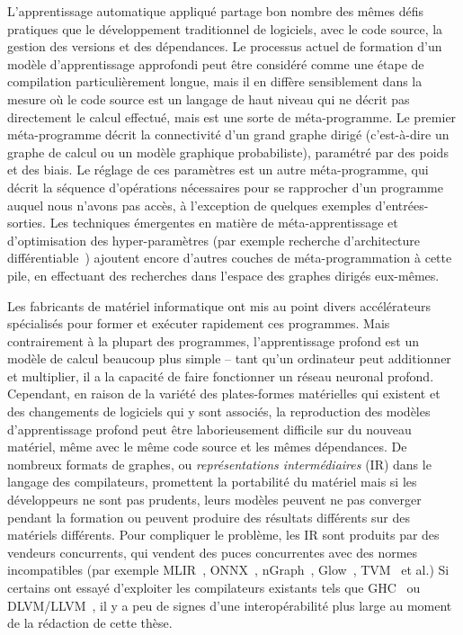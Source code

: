L'apprentissage automatique appliqué partage bon nombre des mêmes défis pratiques que le développement traditionnel de logiciels, avec le code source, la gestion des versions et des dépendances. Le processus actuel de formation d'un modèle d'apprentissage approfondi peut être considéré comme une étape de compilation particulièrement longue, mais il en diffère sensiblement dans la mesure où le code source est un langage de haut niveau qui ne décrit pas directement le calcul effectué, mais est une sorte de méta-programme. Le premier méta-programme décrit la connectivité d'un grand graphe dirigé (c'est-à-dire un graphe de calcul ou un modèle graphique probabiliste), paramétré par des poids et des biais. Le réglage de ces paramètres est un autre méta-programme, qui décrit la séquence d'opérations nécessaires pour se rapprocher d'un programme auquel nous n'avons pas accès, à l'exception de quelques exemples d'entrées-sorties. Les techniques émergentes en matière de méta-apprentissage et d'optimisation des hyper-paramètres (par exemple recherche d'architecture différentiable~\citep{liu2018darts}) ajoutent encore d'autres couches de méta-programmation à cette pile, en effectuant des recherches dans l'espace des graphes dirigés eux-mêmes.

Les fabricants de matériel informatique ont mis au point divers accélérateurs spécialisés pour former et exécuter rapidement ces programmes. Mais contrairement à la plupart des programmes, l'apprentissage profond est un modèle de calcul beaucoup plus simple -- tant qu'un ordinateur peut additionner et multiplier, il a la capacité de faire fonctionner un réseau neuronal profond. Cependant, en raison de la variété des plates-formes matérielles qui existent et des changements de logiciels qui y sont associés, la reproduction des modèles d'apprentissage profond peut être laborieusement difficile sur du nouveau matériel, même avec le même code source et les mêmes dépendances. De nombreux formats de graphes, ou \textit{représentations intermédiaires} (IR) dans le langage des compilateurs, promettent la portabilité du matériel mais si les développeurs ne sont pas prudents, leurs modèles peuvent ne pas converger pendant la formation ou peuvent produire des résultats différents sur des matériels différents. Pour compliquer le problème, les IR sont produits par des vendeurs concurrents, qui vendent des puces concurrentes avec des normes incompatibles (par exemple MLIR~\citep{mlir}, ONNX~\citep{bai2019}, nGraph~\citep{cyphers2018intel}, Glow~\citep{rotem2018glow}, TVM~\citep{tvm2018} et al.) Si certains ont essayé d'exploiter les compilateurs existants tels que GHC~\citep{elliott2018simple} ou DLVM/LLVM~\citep{wei2017dlvm}, il y a peu de signes d'une interopérabilité plus large au moment de la rédaction de cette thèse.

